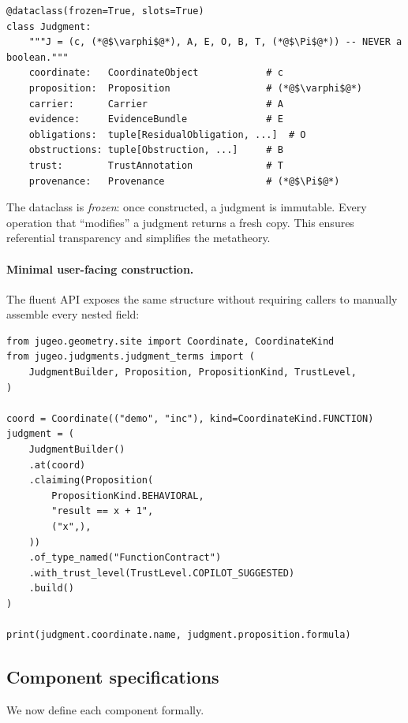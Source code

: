 \documentclass[11pt]{article}
\begin{document}
\begin{lstlisting}[caption={The Judgment dataclass (from \texttt{judgment\_terms.py}).},
  label=lst:judgment]
@dataclass(frozen=True, slots=True)
class Judgment:
    """J = (c, (*@$\varphi$@*), A, E, O, B, T, (*@$\Pi$@*)) -- NEVER a boolean."""
    coordinate:   CoordinateObject            # c
    proposition:  Proposition                 # (*@$\varphi$@*)
    carrier:      Carrier                     # A
    evidence:     EvidenceBundle              # E
    obligations:  tuple[ResidualObligation, ...]  # O
    obstructions: tuple[Obstruction, ...]     # B
    trust:        TrustAnnotation             # T
    provenance:   Provenance                  # (*@$\Pi$@*)
\end{lstlisting}

The dataclass is \emph{frozen}: once constructed, a judgment is immutable.
Every operation that ``modifies'' a judgment returns a fresh copy.
This ensures referential transparency and simplifies the metatheory.

\paragraph{Minimal user-facing construction.}
The fluent API exposes the same structure without requiring callers to
manually assemble every nested field:

\begin{lstlisting}[style=jugeo-python,caption={Building a judgment with the fluent API.}]
from jugeo.geometry.site import Coordinate, CoordinateKind
from jugeo.judgments.judgment_terms import (
    JudgmentBuilder, Proposition, PropositionKind, TrustLevel,
)

coord = Coordinate(("demo", "inc"), kind=CoordinateKind.FUNCTION)
judgment = (
    JudgmentBuilder()
    .at(coord)
    .claiming(Proposition(
        PropositionKind.BEHAVIORAL,
        "result == x + 1",
        ("x",),
    ))
    .of_type_named("FunctionContract")
    .with_trust_level(TrustLevel.COPILOT_SUGGESTED)
    .build()
)

print(judgment.coordinate.name, judgment.proposition.formula)
\end{lstlisting}

\subsection{Component specifications}

We now define each component formally.
\end{document}
